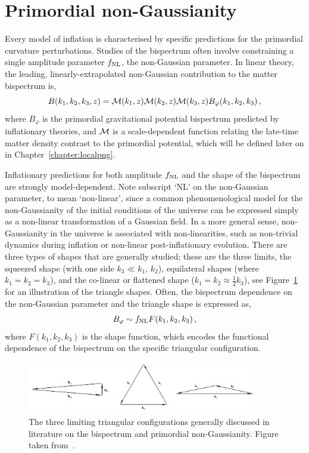 \section{Primordial non-Gaussianity}

Every model of inflation is characterised by specific predictions for the primordial curvature perturbations. Studies of the bispectrum often involve constraining a single amplitude parameter $f_\text{NL}$, the non-Gaussian parameter. In linear theory, the leading, linearly-extrapolated non-Gaussian contribution to the matter bispectrum is, 
\begin{equation}
	B(k_1,k_2,k_3,z) =  \mathcal{M}(k_1,z) \mathcal{M}(k_2,z) \mathcal{M}(k_3,z) B_\varphi(k_1,k_2,k_3)\,,
\end{equation}
where $B_\varphi$ is the primordial gravitational potential bispectrum predicted by inflationary theories, and $\mathcal{M}$ is a scale-dependent function relating the late-time matter density contrast to the primordial potential, which will be defined later on in Chapter~\ref{chapter:localpng}.


Inflationary predictions for both amplitude $f_\text{NL}$ and the shape of the bispectrum are strongly model-dependent. Note subscript `NL' on the non-Gaussian parameter, to mean `non-linear', since a common phenomenological model for the non-Gaussianity of the initial conditions of the universe can be expressed simply as a non-linear transformation of a Gaussian field. In a more general sense, non-Gaussianity in the universe is associated with non-linearities, such as non-trivial dynamics during inflation or non-linear post-inflationary evolution. There are three types of shapes that are generally studied; these are the three limits, the squeezed shape (with one side $k_3 \ll k_1,\,k_2$), equilateral shapes (where $k_1 = k_2 = k_3$), and the co-linear or flattened shape ($k_1 = k_2 \approx \frac{1}{2} k_3$), see Figure~\ref{fig:triangleshapes} for an illustration of the triangle shapes. Often, the bispectrum dependence on the non-Gaussian parameter and the triangle shape is expressed as, 
\begin{equation}
	B_\varphi \sim f_\text{NL} F(k_1,k_2,k_3)\,,
\end{equation}
where $F(k_1,k_2,k_3)$ is the shape function, which encodes the functional dependence of the bispectrum on the specific triangular configuration. 

\begin{figure}[!ht]
	\includegraphics[width=0.9\textwidth]{fig/triangleshapes.png}
	\caption{The three limiting triangular configurations generally discussed in literature on the bispectrum and primordial non-Gaussianity. Figure taken from~\cite{Liguori:2010hx}.}\label{fig:triangleshapes}
\end{figure}


